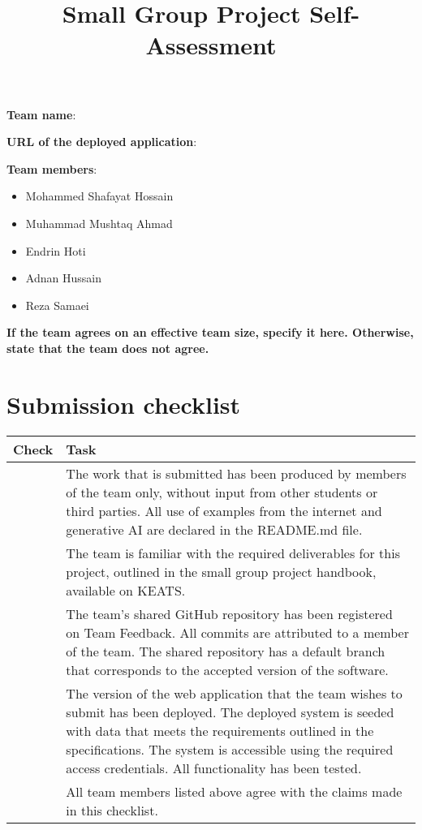\documentclass[11pt,a4paper]{article}
\begin{document}
\title{Small Group Project Self-Assessment}
\author{}
\date{}
\maketitle


\noindent\textbf{Team name}: %

\noindent\textbf{URL of the deployed application}: %

\noindent\textbf{Team members}:
\begin{itemize}
\setlength\itemsep{0em}
\item Mohammed Shafayat Hossain
\item Muhammad Mushtaq Ahmad
\item Endrin Hoti
\item Adnan Hussain
\item Reza Samaei
\end{itemize}

\noindent\textbf{If the team agrees on an effective team size, specify it here.  Otherwise, state that the team does not agree.} 

\section*{Submission checklist}
\begin{tabular}{|p{15mm}|p{13cm}|}
\hline
Check & Task \\
\hline
& The work that is submitted has been produced by members of the team only, without input from other students or third parties.  All use of examples from the internet and generative AI are declared in the README.md file.\\
\hline
& The team is familiar with the required deliverables for this project, outlined in the small group project handbook, available on KEATS.\\
\hline
& The team's shared GitHub repository has been registered on Team Feedback.  All commits are attributed to a member of the team.  The shared repository has a default branch that corresponds to the accepted version of the software.\\
\hline
& The version of the web application that the team wishes to submit has been deployed.  The deployed system is seeded with data that meets the requirements outlined in the specifications.  The system is accessible using the required access credentials.  All functionality has been tested.\\
\hline
& All team members listed above agree with the claims made in this checklist.\\
\hline
\end{tabular}
\end{document}

